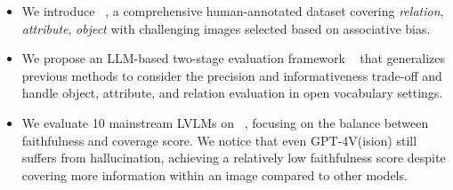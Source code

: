 \begin{itemize}
    \item We introduce \data~, a comprehensive human-annotated dataset covering \textit{relation}, \textit{attribute}, \textit{object} with challenging images selected based on associative bias.
    \item We propose an LLM-based two-stage evaluation framework \eval~ that generalizes previous methods to consider the precision and informativeness trade-off and handle object, attribute, and relation evaluation in open vocabulary settings.
    \item We evaluate 10 mainstream LVLMs on \data~, focusing on the balance between faithfulness and coverage score. We notice that even GPT-4V(ision) \cite{Achiam2023GPT4TR} still suffers from hallucination, achieving a relatively low faithfulness score despite covering more information within an image compared to other models. 
\end{itemize}

